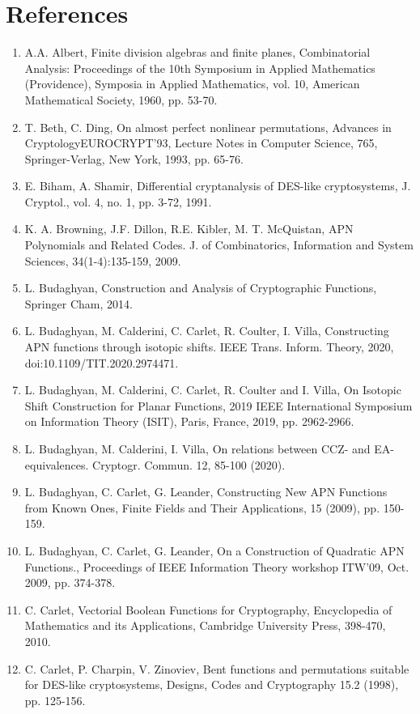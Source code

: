 \documentclass[10pt]{article}
\begin{document}
\section*{References}
\begin{enumerate}
  \item A.A. Albert, Finite division algebras and finite planes, Combinatorial Analysis: Proceedings of the 10th Symposium in Applied Mathematics (Providence), Symposia in Applied Mathematics, vol. 10, American Mathematical Society, 1960, pp. 53-70.
  \item T. Beth, C. Ding, On almost perfect nonlinear permutations, Advances in CryptologyEUROCRYPT'93, Lecture Notes in Computer Science, 765, Springer-Verlag, New York, 1993, pp. 65-76.
  \item E. Biham, A. Shamir, Differential cryptanalysis of DES-like cryptosystems, J. Cryptol., vol. 4, no. 1, pp. 3-72, 1991.
  \item K. A. Browning, J.F. Dillon, R.E. Kibler, M. T. McQuistan, APN Polynomials and Related Codes. J. of Combinatorics, Information and System Sciences, 34(1-4):135-159, 2009.
  \item L. Budaghyan, Construction and Analysis of Cryptographic Functions, Springer Cham, 2014.
  \item L. Budaghyan, M. Calderini, C. Carlet, R. Coulter, I. Villa, Constructing APN functions through isotopic shifts. IEEE Trans. Inform. Theory, 2020, doi:10.1109/TIT.2020.2974471.
  \item L. Budaghyan, M. Calderini, C. Carlet, R. Coulter and I. Villa, On Isotopic Shift Construction for Planar Functions, 2019 IEEE International Symposium on Information Theory (ISIT), Paris, France, 2019, pp. 2962-2966.
  \item L. Budaghyan, M. Calderini, I. Villa, On relations between CCZ- and EA-equivalences. Cryptogr. Commun. 12, 85-100 (2020).
  \item L. Budaghyan, C. Carlet, G. Leander, Constructing New APN Functions from Known Ones, Finite Fields and Their Applications, 15 (2009), pp. 150-159.
  \item L. Budaghyan, C. Carlet, G. Leander, On a Construction of Quadratic APN Functions., Proceedings of IEEE Information Theory workshop ITW'09, Oct. 2009, pp. 374-378.
  \item C. Carlet, Vectorial Boolean Functions for Cryptography, Encyclopedia of Mathematics and its Applications, Cambridge University Press, 398-470, 2010.
  \item C. Carlet, P. Charpin, V. Zinoviev, Bent functions and permutations suitable for DES-like cryptosystems, Designs, Codes and Cryptography 15.2 (1998), pp. 125-156.

\end{enumerate}
\end{document}
